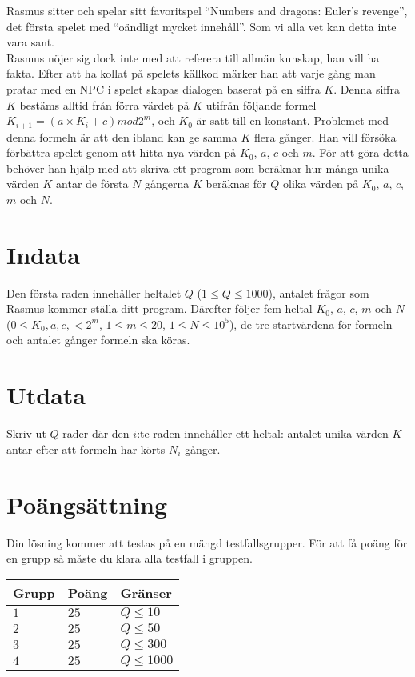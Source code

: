 Rasmus sitter och spelar sitt favoritspel ``Numbers and dragons: Euler's revenge'', det första spelet med ``oändligt mycket innehåll''. Som vi alla vet kan detta inte vara sant. \\
Rasmus nöjer sig dock inte med att referera till allmän kunskap, han vill ha fakta. Efter att ha kollat på spelets källkod märker han att varje gång man pratar med en NPC i spelet skapas dialogen baserat på en siffra $K$.
Denna siffra $K$ bestäms alltid från förra värdet på $K$ utifrån följande formel $K_{i+1}=(a \times K_i+c) mod 2^m$, och $K_0$ är satt till en konstant. Problemet med denna formeln är
att den ibland kan ge samma $K$ flera gånger. Han vill försöka förbättra spelet genom att hitta nya värden på $K_0$, $a$, $c$ och $m$. För att göra detta behöver han hjälp med att skriva ett
program som beräknar hur många unika värden $K$ antar de första $N$ gångerna $K$ beräknas för $Q$ olika värden på $K_0$, $a$, $c$, $m$ och $N$.

\section*{Indata}
Den första raden innehåller heltalet $Q$ ($1 \leq Q \leq 1000$), antalet frågor som Rasmus kommer ställa ditt program.
Därefter följer fem heltal $K_0$, $a$, $c$, $m$ och $N$ ($0 \le K_0, a, c, < 2^m$, $1 \le m \le 20$, $1 \le N \le 10^5$), de tre startvärdena för formeln och antalet gånger formeln ska köras.

\section*{Utdata}
Skriv ut $Q$ rader där den $i$:te raden innehåller ett heltal: antalet unika värden $K$ antar efter att formeln har körts $N_i$ gånger.

\section*{Poängsättning}
Din lösning kommer att testas på en mängd testfallsgrupper.
För att få poäng för en grupp så måste du klara alla testfall i gruppen.

\noindent
\begin{tabular}{| l | l | p{12cm} |}
  \hline
  \textbf{Grupp} & \textbf{Poäng} & \textbf{Gränser} \\ \hline
  $1$    & $25$      & $Q \leq 10$ \\ \hline
  $2$    & $25$      & $Q \leq 50$ \\ \hline
  $3$    & $25$      & $Q \leq 300$ \\ \hline
  $4$    & $25$      & $Q \leq 1000$ \\ \hline
\end{tabular}
